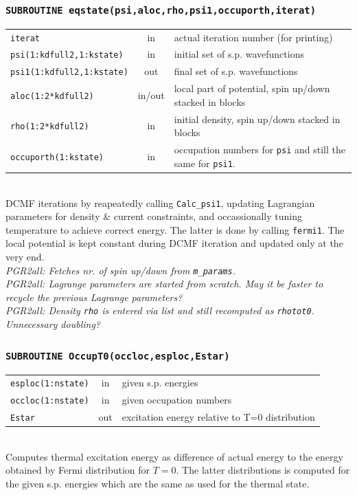 \documentclass[final,1p]{elsarticle}
\newcommand{\PGRcomm}[1]{{\color{blue}\small\em PGR2all: #1}}
\begin{document}
\subsubsection*{\tt SUBROUTINE eqstate(psi,aloc,rho,psi1,occuporth,iterat)}
\begin{tabular}{lcl}
 {\tt iterat} & in & actual iteration number (for printing)\\
 {\tt psi(1:kdfull2,1:kstate)} & in & initial set of
 s.p. wavefunctions\\
 {\tt psi1(1:kdfull2,1:kstate)} & out & final set of s.p. wavefunctions\\
 {\tt aloc(1:2*kdfull2)} & in/out & local part of potential, spin
 up/down stacked in blocks\\
 {\tt rho(1:2*kdfull2)} & in & initial density, spin
 up/down stacked in blocks \\
 {\tt occuporth(1:kstate)} & in & occupation numbers for {\tt psi} and
 still the same for {\tt psi1}.\\
\end{tabular}
\\[4pt]
DCMF iterations by reapeatedly calling {\tt Calc\_psi1},
updating Lagrangian parameters for density \& current constraints, and
occassionally tuning temperature to achieve correct energy. The
latter is done by calling {\tt fermi1}. The local potential
is kept constant during DCMF iteration and updated only at the very end.
\\
\PGRcomm{Fetches nr. of spin up/down from {\tt m\_params}.}
\\
\PGRcomm{Lagrange parameters are started from scratch. May it be
  faster to recycle the previous Lagrange parameters?
}
\\
\PGRcomm{Density {\tt rho} is entered via list and still recomputed
as {\tt rhotot0}. Unnecessary doubling?}


\subsubsection*{\tt SUBROUTINE OccupT0(occloc,esploc,Estar)}
\begin{tabular}{lcl}
 {\tt esploc(1:nstate)} & in & given s.p. energies\\
 {\tt occloc(1:nstate)} & in & given occupation numbers\\
 {\tt Estar} & out & excitation energy relative to T=0 distribution\\
\end{tabular}
\\[4pt]
Computes thermal excitation energy as difference of actual energy to
the energy obtained by Fermi distribution for $T=0$. The latter
distributions  is computed for the given s.p. energies which are the
same as used for the thermal state.
\end{document}

